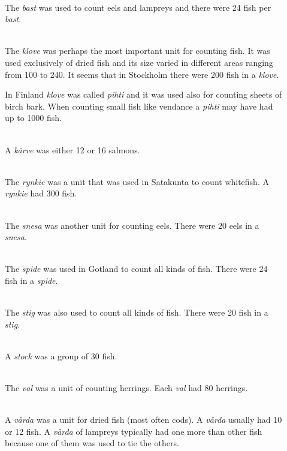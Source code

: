 \documentclass[a4paper]{article}
\newcommand{\samplefont}{\fontsize{16}{16}\abcursivefamily\spaceskip0.2em}
\newcommand{\sample}[1]{{\samplefont #1 \strut}}
\begin{document}
\begin{description}
  
\item [\sample{bast} \emph{bast}] \mbox{} \\
  The \emph{bast} was used to count eels and lampreys and there were 24
  fish per \emph{bast}. 

\item [\sample{kloffue} \emph{klove}, \emph{pihti} ] \mbox{} \\
  The \emph{klove} was perhaps the most important unit for counting
  fish. It was used exclusively of dried fish and its size varied in
  different areas ranging from 100 to 240. It seems that in Stockholm
  there were 200 fish in a \emph{klove}. 

  In Finland \emph{klove} was called \emph{pihti} and it was used also
  for counting sheets of birch bark. When counting small fish like
  vendance a \emph{pihti} may have had up to 1000 fish.

\item [\sample{kärffue} \emph{kärve}] \mbox{} \\
  A \emph{kärve} was either 12 or 16 salmons.

\item [\sample{rynkie} \emph{rynkie} ] \mbox{} \\
  The \emph{rynkie} was a unit that was used in Satakunta to count
  whitefish. A \emph{rynkie} had 300 fish.

\item [\sample{snesa} \emph{snesa} ] \mbox{} \\
  The \emph{snesa} was another unit for counting eels. There were 20
  eels in a \emph{snesa}. 

\item [\sample{spidh} \emph{spide}] \mbox{} \\
  The \emph{spide} was used in Gotland to count all kinds of fish.
  There were 24 fish in a \emph{spide}. 

\item [\sample{stig} \emph{stig}] \mbox{} \\
  The \emph{stig} was also used to count all kinds of fish. There were
  20 fish in a \emph{stig}. 


\item [\sample{stock} \emph{stock}, \emph{joukko}] \mbox{} \\
  A \emph{stock} was a group of 30 fish. 

\item [\sample{val} \emph{val}, \emph{vaali}] \mbox{} \\
  The \emph{val} was a unit of counting herrings. Each \emph{val}
  had 80 herrings. 

\item [\sample{vaardh} \emph{vårda}, \emph{nippu}] \mbox{} \\
  A \emph{vårda} was a unit for dried fish (most often cods). A
  \emph{vårda} usually had 10 or 12 fish. A \emph{vårda} of lampreys
  typically had one more than other fish because one of them was used
  to tie the others.
  
\end{description}
\end{document}

